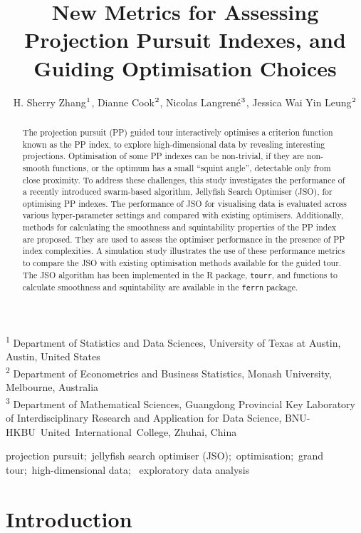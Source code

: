\documentclass[
  12pt,
]{interact}
\title{New Metrics for Assessing Projection Pursuit Indexes, and Guiding
Optimisation Choices}
\author{H. Sherry Zhang$\textsuperscript{1}$, Dianne
Cook$\textsuperscript{2}$, Nicolas
Langrené$\textsuperscript{3}$, Jessica Wai Yin
Leung$\textsuperscript{2}$}
\theoremstyle{plain}
\begin{document}
\captionsetup{labelsep=space}
\maketitle
\textsuperscript{1} Department of Statistics and Data
Sciences, University of Texas at Austin, Austin, United
States\\ \textsuperscript{2} Department of Econometrics and Business
Statistics, Monash
University, Melbourne, Australia\\ \textsuperscript{3} Department of
Mathematical Sciences, Guangdong Provincial Key Laboratory of
Interdisciplinary Research and Application for Data Science,
BNU-HKBU~United~International~College, Zhuhai, China
\begin{abstract}
The projection pursuit (PP) guided tour interactively optimises a
criterion function known as the PP index, to explore high-dimensional
data by revealing interesting projections. Optimisation of some PP
indexes can be non-trivial, if they are non-smooth functions, or the
optimum has a small ``squint angle'', detectable only from close
proximity. To address these challenges, this study investigates the
performance of a recently introduced swarm-based algorithm, Jellyfish
Search Optimiser (JSO), for optimising PP indexes. The performance of
JSO for visualising data is evaluated across various hyper-parameter
settings and compared with existing optimisers. Additionally, methods
for calculating the smoothness and squintability properties of the PP
index are proposed. They are used to assess the optimiser performance in
the presence of PP index complexities. A simulation study illustrates
the use of these performance metrics to compare the JSO with existing
optimisation methods available for the guided tour. The JSO algorithm
has been implemented in the R package, \texttt{tourr}, and functions to
calculate smoothness and squintability are available in the
\texttt{ferrn} package.
\end{abstract}
\begin{keywords}
\def\sep{;\ }
projection pursuit\sep jellyfish search optimiser
(JSO)\sep optimisation\sep grand tour\sep high-dimensional data\sep 
exploratory data analysis
\end{keywords}


\section{Introduction}\label{introduction}
\end{document}
